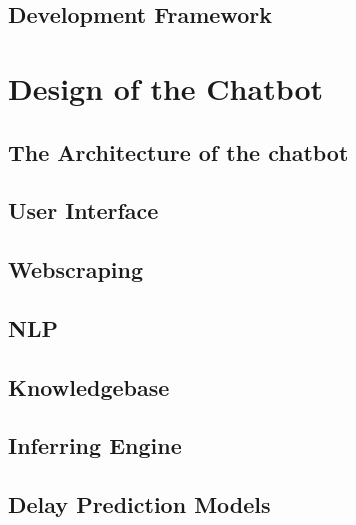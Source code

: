 \documentclass[11pt]{article}
\begin{document}
 
\subsection{Development Framework} \label{development-framework}


\section{Design of the Chatbot} \label{design}

 
\subsection{The Architecture of the chatbot} \label{architecture}

\subsection{User Interface} \label{user-interface}

\subsection{Webscraping} \label{webscraping}

\subsection{NLP} \label{nlp}

\subsection{Knowledgebase} \label{knowledgebase}

% 
\subsection{Inferring Engine} \label{inference-engine}

\subsection{Delay Prediction Models} \label{delay-prediction}
\end{document}

